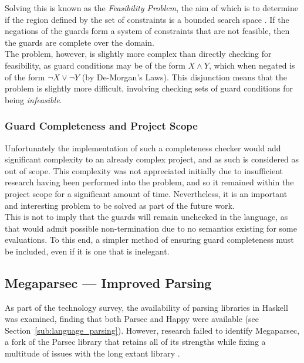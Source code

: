 Solving this is known as the \textit{Feasibility Problem}, the aim of which is to determine if the region defined by the set of constraints is a bounded search space \citep{luenberger2016simplex}. 
If the negations of the guards form a system of constraints that are not feasible, then the guards are complete over the domain. \\

The problem, however, is slightly more complex than directly checking for feasibility, as guard conditions may be of the form $X \land Y$, which when negated is of the form $\lnot X \lor \lnot Y$ (by De-Morgan's Laws).
This disjunction means that the problem is slightly more difficult, involving checking sets of guard conditions for being \textit{infeasible}.


\subsubsection{Guard Completeness and Project Scope} %
\label{ssub:guard_completeness_and_project_scope}
Unfortunately the implementation of such a completeness checker would add significant complexity to an already complex project, and as such is considered as out of scope.
This complexity was not appreciated initially due to insufficient research having been performed into the problem, and so it remained within the project scope for a significant amount of time. 
Nevertheless, it is an important and interesting problem to be solved as part of the future work.\\

This is not to imply that the guards will remain unchecked in the language, as that would admit possible non-termination due to no semantics existing for some evaluations.
To this end, a simpler method of ensuring guard completeness must be included, even if it is one that is inelegant. 



\subsection{Megaparsec --- Improved Parsing} %
\label{sub:megaparsec_improved_parsing}
As part of the technology survey, the availability of parsing libraries in Haskell was examined, finding that both Parsec and Happy were available (see Section~\ref{sub:language_parsing}). 
However, research failed to identify Megaparsec, a fork of the Parsec library that retains all of its strengths while fixing a multitude of issues with the long extant library \citep{megaparsec}.\\

